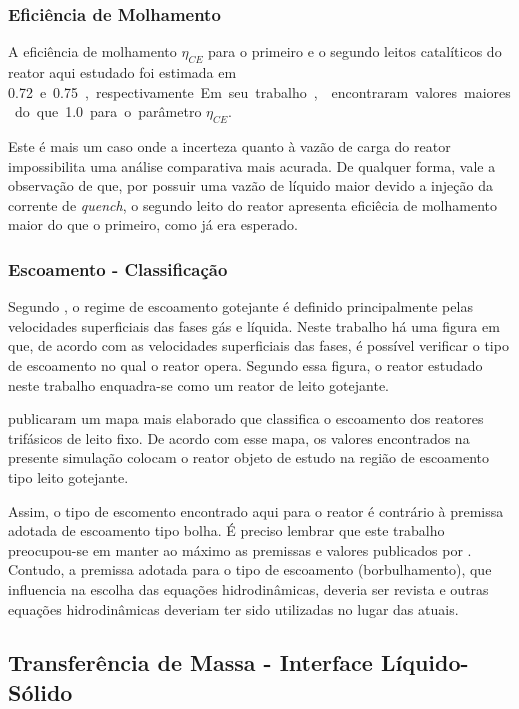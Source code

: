 \subsubsection{Eficiência de Molhamento} \label{eficienciademolhamento}

A eficiência de molhamento $\eta_{CE}$ para o primeiro e o segundo leitos
catalíticos do reator aqui estudado foi estimada em \SI{0,72} e \SI{0,75},
respectivamente. Em seu trabalho,  encontraram valores
maiores do que \SI{1,0} para o parâmetro $\eta_{CE}$.

Este é mais um caso onde a incerteza quanto à vazão de carga do reator
impossibilita uma análise comparativa mais acurada. De qualquer forma, vale a
observação de que, por possuir uma vazão de líquido maior devido a injeção da
corrente de \emph{quench}, o segundo leito do reator apresenta eficiêcia de
molhamento maior do que o primeiro, como já era esperado.

\subsubsection{Escoamento - Classificação} \label{escoamentoclassificacao}

Segundo , o regime de escoamento gotejante é definido
principalmente pelas velocidades superficiais das fases gás e líquida. Neste
trabalho há uma figura em que, de acordo com as velocidades superficiais das
fases, é possível verificar o tipo de escoamento no qual o reator opera. Segundo
essa figura, o reator estudado neste trabalho enquadra-se como um reator de
leito gotejante.

 publicaram um mapa mais elaborado que classifica o
escoamento dos reatores trifásicos de leito fixo. De acordo com esse mapa, os
valores encontrados na presente simulação colocam o reator objeto de estudo na
região de escoamento tipo leito gotejante.

Assim, o tipo de escomento encontrado aqui para o reator é contrário à premissa
adotada de escoamento tipo bolha. É preciso lembrar que este trabalho
preocupou-se em manter ao máximo as premissas e valores publicados por
. Contudo, a premissa adotada para o tipo de escoamento
(borbulhamento), que influencia na escolha das equações hidrodinâmicas, deveria
ser revista e outras equações hidrodinâmicas deveriam ter sido utilizadas no
lugar das atuais.

\subsection{Transferência de Massa - Interface Líquido-Sólido}
\label{transferênciademassainterfaceliquidosolido}

